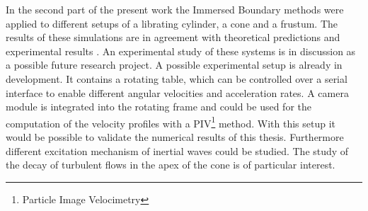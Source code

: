 In the second part of the present work the Immersed Boundary methods were applied to different setups of a librating cylinder,  a cone and a frustum.
The results of these simulations are in agreement with theoretical
predictions \citep{Greenspan1969} and experimental results \cite{Beardsley1970}.
An experimental study of these systems is in discussion as a possible future research project.
A possible experimental setup is already in development.
It contains a rotating table, which can be controlled over a serial interface to enable different angular velocities and acceleration rates.
A camera module is integrated into the rotating frame and could be used for the computation
of the velocity profiles with a PIV\footnote{Particle Image Velocimetry}
method.
With this setup it would be possible to validate the numerical results of this thesis.
Furthermore different excitation mechanism of inertial waves could be studied.
The study of the decay of turbulent flows in the apex of the cone is of particular interest.



